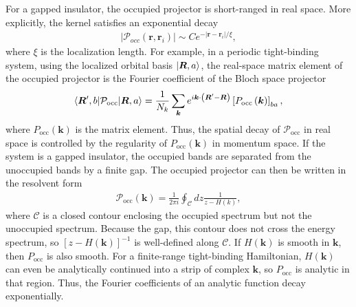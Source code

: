 \documentclass[12pt, oneside]{article}
\numberwithin{equation}{subsection}
\begin{document}
For a gapped insulator, the occupied projector is short-ranged in real space. More explicitly, the kernel satisfies an exponential decay 
\begin{align}
	\left|\mathcal{P}_{occ} \left(\bm{r}, \bm{r}_{i}\right)\right| \sim C e^{-\left|\bm{r}-\bm{r}_{i}\right|/\xi},
\end{align}
where \(\xi\) is the localization length. For example, in a periodic tight-binding system, using the localized orbital basis \(\ket{\bm{R},a}\), the real-space matrix element of the occupied projector is the Fourier coefficient of the Bloch space projector
\begin{align}
	\braket{\bm{R}^{\prime}, b | \mathcal{P}_{\mathrm{occ}} |\bm{R}, a} = \frac{1}{N_k} \sum_{\bm{k}} e^{i \bm{k}\cdot \left(\bm{R}^{\prime} - \bm{R}\right)} \left[P_{\mathrm{occ}} \left(\bm{k}\right)\right]_{ba},
\end{align}
where \(P_{\mathrm{occ}} \left(\bm{k}\right)\) is the matrix element. Thus, the spatial decay of \(\mathcal{P}_{\mathrm{occ}}\) in real space is controlled by the regularity of \(P_{\mathrm{occ}} \left(\bm{k}\right)\) in momentum space. If the system is a gapped insulator, the occupied bands are separated from the unoccupied bands by a finite gap. The occupied projector can then be written in the resolvent form 
\begin{align}
	\mathcal{P}_{\mathrm{occ}}\left(\bm{k}\right) = \frac{1}{2 \pi i} \oint_{\mathcal{C}}d z \frac{1}{z - H \left(k\right)},
\end{align}
where \(\mathcal{C}\) is a closed contour enclosing the occupied spectrum but not the unoccupied spectrum. Because the gap, this contour does not cross the energy spectrum, so \(\left[z - H \left(\bm{k}\right)\right]^{-1}\) is well-defined along \(\mathcal{C}\). If \(H \left(\bm{k}\right)\) is smooth in \(\bm{k}\), then \(P_{\mathrm{occ}}\) is also smooth. For a finite-range  tight-binding Hamiltonian, \(H \left(\bm{k}\right)\) can even be analytically continued into a strip of complex \(\bm{k}\), so \(P_{\mathrm{occ}}\) is analytic in that region. Thus, the Fourier coefficients of an analytic function decay exponentially.
\end{document}
